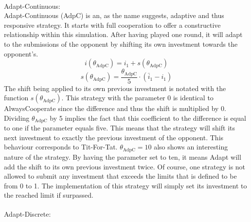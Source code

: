 \documentclass{article}
\begin{document}
		\\Adapt-Continuous:\\
Adapt-Continuous (AdpC) is an, as the name suggests, adaptive and thus responsive strategy.
It starts with full cooperation to offer a constructive relationship within this simulation.
After having played one round, it will adapt to the submissions of the opponent by shifting its own investment towards the opponent's.
$$i(\theta_{\mathrm{AdpC}}) = i_1 + s(\theta_{\mathrm{AdpC}})$$
$$s(\theta_{\mathrm{AdpC}}) = \frac{\theta_{\mathrm{AdpC}}}{5} \cdot (\bar i_1 - i_1)$$
The shift being applied to its own previous investment is notated with the function $s(\theta_{\mathrm{AdpC}})$.
This strategy with the parameter 0 is identical to AlwaysCooperate since the difference and thus the shift is multiplied by 0.
Dividing $\theta_{\mathrm{AdpC}}$ by 5 implies the fact that this coefficient to the difference is equal to one if the parameter equals five.
This means that the strategy will shift its next investment to exactly the previous investment of the opponent.
This behaviour corresponds to Tit-For-Tat.
$\theta_{\mathrm{AdpC}} = 10$ also shows an interesting nature of the strategy.
By having the parameter set to ten, it means Adapt will add the shift to its own previous investment twice.
Of course, one strategy is not allowed to submit any investment that exceeds the limits that is defined to be from 0 to 1.
The implementation of this strategy will simply set its investment to the reached limit if surpassed.\\
		\\Adapt-Discrete:\\
\end{document}
